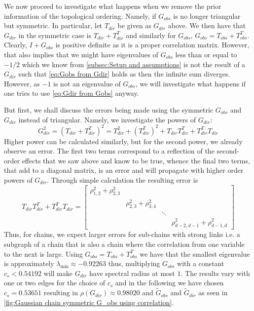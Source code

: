 \documentclass[../Thesis.tex]{subfiles}
\begin{document}
We now proceed to investigate what happens when we remove the prior information of the topological ordering. Namely, if $G_{obs}$ is no longer triangular but symmetric. In particular, let $T_{dir}$ be given as $G_{dir}$ above. We then have that $G_{dir}$ in the symmetric case is $T_{dir} + T_{dir}^T$ and similarly for $G_{obs}$, $G_{obs} = T_{obs} + T_{obs}^T$. Clearly, $I + G_{obs}$ is positive definite as it is a proper correlation matrix. However, that also implies that we might have eigenvalues of $G_{obs}$ less than or equal to $-1/2$ which we know from \autoref{subsec:Setup and assumptions} is not the result of a $G_{dir}$ such that \autoref{eq:Gobs from Gdir} holds as then the infinite sum diverges. However, as $-1$ is not an eigenvalue of $G_{obs}$, we will investigate what happens if one tries to use \autoref{eq:Gdir from Gobs} anyway.

But first, we shall discuss the errors being made using the symmetric $G_{obs}$ and $G_{dir}$ instead of triangular. Namely, we investigate the powers of $G_{dir}$:
$$G_{dir}^2 = \left(T_{dir} + T_{dir}^T\right)^2 = T_{dir}^2 + \left(T_{dir}^T\right)^2 + T_{dir} T_{dir}^T + T_{dir}^T T_{dir}$$
Higher power can be calculated similarly, but for the second power, we already observe an error. The first two terms correspond to a reflection of the second-order effects that we saw above and know to be true, whence the final two terms, that add to a diagonal matrix, is an error and will propagate with higher order powers of $G_{dir}$. Through simple calculation the resulting error is
$$T_{dir} T_{dir}^T + T_{dir}^T T_{dir} = \begin{bmatrix}
        \rho_{1,2}^2 + \rho_{2,3}^2 &                             &        &                                   \\
                                    & \rho_{2,3}^2 + \rho_{3,4}^2 &        &                                   \\
                                    &                             & \ddots &                                   \\
                                    &                             &        & \rho_{d-2,d-1}^2 + \rho_{d-1,d}^2
\end{bmatrix}$$
Thus, for chains, we expect larger errors for sub-chains with strong links i.e. a subgraph of a chain that is also a chain where the correlation from one variable to the next is large. Using $G_{obs} = T_{obs} + T_{obs}^T$ we have that the smallest eigenvalue is approximately $\lambda_{\min} \approx -0.92263$ thus, multiplying $G_{obs}$ with a constant $c_s < 0.54192$ will make $G_{dir}$ have spectral radius at most $1$. The results vary with one or two edges for the choice of $c_s$ and in the following we have chosen $c_s = 0.53651$ resulting in $\rho\left(G_{dir}\right) \approx 0.98020$ and $\tilde{G}_{obs}$ and $\tilde{G}_{dir}$ as seen in \autoref{fig:Gaussian chain symmetric G_obs using correlation}.
\end{document}
